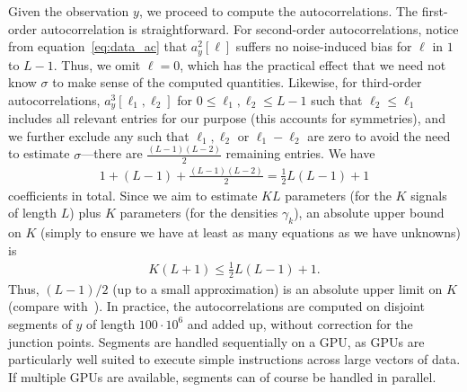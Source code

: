 \documentclass[12pt]{article}
\newcommand{\1}{\mathbf{1}}
\newcommand{\TODO}[1]{{\color{red}{[#1]}}}
\theoremstyle{plain}
\theoremstyle{definition}
\theoremstyle{remark}
\theoremstyle{plain}
\theoremstyle{remark}
\theoremstyle{plain}
\theoremstyle{plain}
\theoremstyle{plain}
\numberwithin{equation}{section}
\begin{document}
%
Given the observation $y$, we proceed to compute the autocorrelations. The first-order autocorrelation is straightforward. For second-order autocorrelations, notice from equation~\eqref{eq:data_ac} that $a_y^2[\ell]$ suffers no noise-induced bias for $\ell$ in $1$ to $L-1$. Thus, we omit $\ell = 0$, which has the practical effect that we need not know $\sigma$ to make sense of the computed quantities. Likewise, for third-order autocorrelations, $a_y^3[\ell_1, \ell_2]$ for $0 \leq \ell_1, \ell_2 \leq L-1$ such that $\ell_2 \leq \ell_1$ includes all relevant entries for our purpose (this accounts for symmetries), and we further exclude any such that $\ell_1, \ell_2$ or $\ell_1 - \ell_2$ are zero to avoid the need to estimate $\sigma$---there are $\frac{(L-1)(L-2)}{2}$ remaining entries. We have
\begin{align*}
1 + (L-1) + \frac{(L-1)(L-2)}{2} = \frac{1}{2} L (L-1) + 1
\end{align*}
coefficients in total. Since we aim to estimate $KL$ parameters (for the $K$ signals of length $L$) plus $K$ parameters (for the densities $\gamma_k$), an absolute upper bound on $K$ (simply to ensure we have at least as many equations as we have unknowns) is
\begin{align*}
K(L+1) \leq \frac{1}{2} L (L-1) + 1.
\end{align*}
Thus, $(L-1)/2$ (up to a small approximation) is an absolute upper limit on $K$ (compare with~\cite{boumal2017heterogeneous,bandeira2017estimation}). \TODO{The last paragraph can be removed}
In practice, the autocorrelations are computed on disjoint segments of $y$ of length $100\cdot10^6$ and added up, without correction for the junction points. Segments are handled sequentially on a GPU, as GPUs are particularly well suited to execute simple instructions across large vectors of data. If multiple GPUs are available, segments can of course be handled in parallel.
\end{document}
